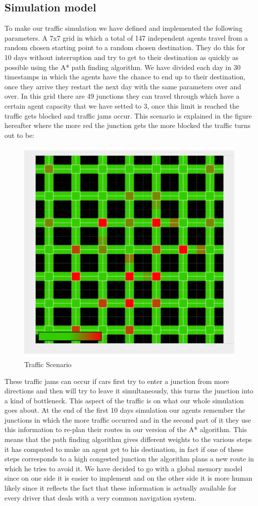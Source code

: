 \documentclass[a4paper,hidelinks]{article}
\begin{document}
\subsection{Simulation model}
To make our traffic simulation we have defined and implemented the following parameters. A 7x7 grid in which a total of 147 independent agents travel from a random chosen starting point to a random chosen destination. They do this for 10 days without interruption and try to get to their destination as quickly as possible using the A* path finding algorithm. We have divided each day in 30 timestamps in which the agents have the chance to end up to their destination, once they arrive they restart the next day with the same parameters over and over. In this grid there are 49 junctions they can travel through which have a certain agent capacity that we have setted to 3, once this limit is reached the traffic gets blocked and traffic jams occur. This scenario is explained in the figure hereafter where the more red the junction gets the more blocked the traffic turns out to be:

\begin{figure}[ht!]
\centering
\includegraphics[width = 0.7\linewidth]{grid}
\caption{Traffic Scenario \label{overflow}}
\end{figure} 


These traffic jams can occur if cars first try to enter a junction from more directions and then will try to leave it simultaneously, this turns the junction into a kind of bottleneck. This aspect of the traffic is on what our whole simulation goes about. At the end of the first 10 days simulation our agents remember the junctions in which the more traffic occurred and in the second part of it they use this information to re-plan their routes in our version of the A* algorithm. This means that the path finding algorithm gives different weights to the various steps it has computed to make an agent get to his destination, in fact if one of these steps corresponds to a high congested junction the algorithm plans a new route in which he tries to avoid it. We have decided to go with a global memory model since on one side it is easier to implement and on the other side it is more human likely since it reflects the fact that these information is actually available for every driver that deals with a very common navigation system. 
\end{document}
